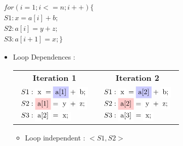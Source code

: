 \documentclass{beamer}
\begin{document}
{
	\frametitle{\subsecname}
	\begin{center}
	$\begin{array}{lcl}
	for(i = 1; i <= n; i++) \{\\
	S1: x = a[i] + b;\\
	S2: a[i] = y + z;\\
	S3: a[i + 1] = x; \}
	\end{array}$ \\
	\end{center}
	\begin{itemize}
	\item Loop Dependences : 	
	\begin{table}
	\centering
	\begin{tabular}{c c} %
	\textbf{Iteration 1} & \textbf{Iteration 2} \\
	{$\begin{array}{lcl}
	S1: \tikz[baseline]{\node[fill=white!20,anchor=base]{x};} = \tikz[baseline]{\node[fill=blue!20,anchor=base]{a[1]};} + \tikz[baseline]{\node[fill=white!20,anchor=base]{b;};}\\
	S2: \tikz[baseline]{\node[fill=red!20,anchor=base]{a[1]};} = \tikz[baseline]{\node[fill=white!20,anchor=base]{y};} + \tikz[baseline]{\node[fill=white!20,anchor=base]{z;};}\\
	S3: \tikz[baseline]{\node[fill=white!20,anchor=base]{a[2]};} = \tikz[baseline]{\node[fill=white!20,anchor=base]{x;};} 
	\end{array}$}
	&
	{$\begin{array}{lcl}
	S1: \tikz[baseline]{\node[fill=white!20,anchor=base]{x};} = \tikz[baseline]{\node[fill=blue!20,anchor=base]{a[2]};} + \tikz[baseline]{\node[fill=white!20,anchor=base]{b;};}\\
	S2: \tikz[baseline]{\node[fill=red!20,anchor=base]{a[2]};} = \tikz[baseline]{\node[fill=white!20,anchor=base]{y};} + \tikz[baseline]{\node[fill=white!20,anchor=base]{z;};}\\
	S3: \tikz[baseline]{\node[fill=white!20,anchor=base]{a[3]};} = \tikz[baseline]{\node[fill=white!20,anchor=base]{x;};} 
	\end{array}$} \\

	\end{tabular}
	\end{table}
	\begin{itemize}
	\item Loop independent : $<S1, S2>$
	
	\end{itemize}
	
	\end{itemize}
	
}
\end{document}
